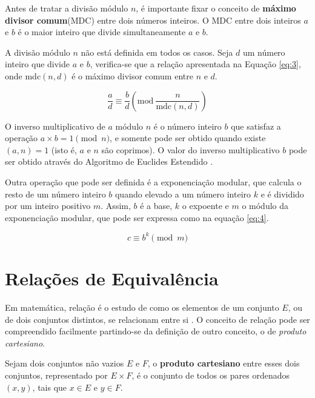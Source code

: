 Antes de tratar a divisão módulo \(n\), é importante fixar o conceito de \textbf{máximo divisor comum}(MDC) entre dois números inteiros. O MDC entre dois inteiros \(a\) e \(b\) 
é o maior inteiro que divide simultaneamente \(a\) e \(b\).

A divisão módulo $n$ não está definida em todos os casos. Seja \(d\) um número inteiro que divide \(a\) e \(b\), verifica-se que a relação apresentada na Equação \ref{eq:3}, onde mdc\((n, d)\) é o máximo divisor comum entre \(n\) e \(d\).

\begin{equation}
  \frac{a}{d} \equiv \frac{b}{d}\left(\mbox{mod}\ \frac{n}{\text{mdc}(n,d)}\right) \label{eq:3}
\end{equation}

O inverso multiplicativo de $a$ módulo \(n\) é o número inteiro \(b\) que satisfaz a operação \(a \times b = 1 \pmod  n\), e somente pode ser obtido quando existe \((a, n) = 1\) (isto é, \(a\) e \(n\) são coprimos). O valor do inverso multiplicativo \(b\) pode ser obtido através do Algoritmo de Euclides Estendido \cite{Halim:2013}.

\par Outra operação que pode ser definida é a exponenciação modular, que calcula o resto de um número inteiro \(b\) quando elevado a um número inteiro \(k\) e é dividido por um inteiro positivo \(m\). Assim, $b$ é a base, $k$ o expoente e $m$ o módulo da exponenciação modular, que pode ser expressa como na equação \ref{eq:4}.

\begin{equation}
  c \equiv b^k\pmod m \label{eq:4}
\end{equation}


%
%
\section{Relações de Equivalência}
\label{relacoes_equivalencia}

Em matemática, relação é o estudo de como os elementos de um conjunto $E$, ou de dois conjuntos distintos, se relacionam entre si \cite{Domingues:2003}. O conceito de relação pode ser compreendido facilmente partindo-se da definição de outro conceito, o de \textit{produto cartesiano}.

Sejam dois conjuntos não vazios \(E\) e \(F\), o \textbf{produto cartesiano} entre esses dois conjuntos, representado por \(E \times F\), é o conjunto de todos os pares ordenados \((x, y)\), tais que \(x \in E\) e \(y \in F\).

